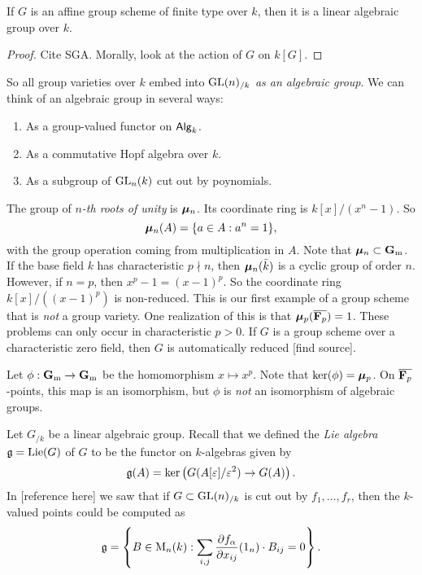 \begin{theorem}
If $G$ is an affine group scheme of finite type over $k$, then it is a 
linear algebraic group over $k$. 
\end{theorem}
\begin{proof}
Cite SGA. Morally, look at the action of $G$ on $k[G]$. 
\end{proof}

So all group varieties over $k$ embed into $\operatorname{GL}(n)_{/k}$ \emph{as an algebraic 
group}. We can think of an algebraic group in several ways: 
\begin{enumerate}
  \item As a group-valued functor on $\mathsf{Alg}_{k}$. 
  \item As a commutative Hopf algebra over $k$. 
  \item As a subgroup of $\operatorname{GL}_n(k)$ cut out by poynomials. 
\end{enumerate}

\begin{example}
The group of \emph{$n$-th roots of unity} is $\bm{\mu}_n$. Its coordinate ring is 
$k[x]/(x^n-1)$. So 
\[
  \bm{\mu}_n(A) = \{a\in A:a^n=1\} ,
\]
with the group operation coming from multiplication in $A$. Note that 
$\bm{\mu}_n\subset \mathbf{G}_\mathrm{m}$. If the base field $k$ has characteristic 
$p\nmid n$, then $\bm{\mu}_n(\bar k)$ is a cyclic group of order $n$. However, if 
$n=p$, then $x^p-1=(x-1)^p$. So the coordinate ring 
$k[x]/((x-1)^p)$ is non-reduced. This is our first example of a group scheme 
that is \emph{not} a group variety. One realization of this is that 
$\bm{\mu}_p(\overline{\mathbf{F}_p})=1$. These problems can only occur in characteristic 
$p>0$. If $G$ is a group scheme over a characteristic zero field, then 
$G$ is automatically reduced [find source]. 

Let $\phi:\mathbf{G}_\mathrm{m}\to \mathbf{G}_\mathrm{m}$ be the homomorphism $x\mapsto x^p$. Note that 
$\ker(\phi)=\bm{\mu}_p$. On $\overline{\mathbf{F}_p}$-points, this map is an isomorphism, 
but $\phi$ is \emph{not} an isomorphism of algebraic groups. 
\end{example}

Let $G_{/k}$ be a linear algebraic group. Recall that we defined the \emph{Lie 
algebra} $\mathfrak{g}=\operatorname{Lie}(G)$ of $G$ to be the functor on $k$-algebras given by 
\[
  \mathfrak{g}(A) = \ker\left(G(A[\varepsilon]/\varepsilon^2) \to G(A)\right) .
\]
In [reference here] we saw that if $G\subset \operatorname{GL}(n)_{/k}$ is cut out by 
$f_1,\dots,f_r$, then the $k$-valued points could be computed as 
\[
  \mathfrak{g} = \left\{B\in \operatorname{M}_n(k):\sum_{i,j} \frac{\partial f_\alpha}{\partial x_{i j}}(1_n)\cdot B_{i j}=0\right\} .
\]


